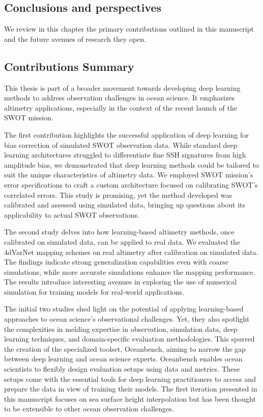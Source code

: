 \begin{bibunit}

\chapter*{Conclusions and perspectives}
\label{chap:conclusions}
We review in this chapter the primary contributions outlined in this manuscript and the future avenues of research they open.

\section*{Contributions Summary}
This thesis is part of a broader movement towards developing deep learning methods to address observation challenges in ocean science. It emphasizes altimetry applications, especially in the context of the recent launch of the SWOT mission.

The first contribution highlights the successful application of deep learning for bias correction of simulated SWOT observation data. While standard deep learning architectures struggled to differentiate fine SSH signatures from high amplitude bias, we demonstrated that deep learning methods could be tailored to suit the unique characteristics of altimetry data. We employed SWOT mission's error specifications to craft a custom architecture focused on calibrating SWOT's correlated errors. This study is promising, yet the method developed was calibrated and assessed using simulated data, bringing up questions about its applicability to actual SWOT observations.

The second study delves into how learning-based altimetry methods, once calibrated on simulated data, can be applied to real data. We evaluated the 4dVarNet mapping schemes on real altimetry after calibration on simulated data. The findings indicate strong generalization capabilities even with coarse simulations, while more accurate simulations enhance the mapping performance. The results introduce interesting avenues in exploring the use of numerical simulation for training models for real-world applications.

The initial two studies shed light on the potential of applying learning-based approaches to ocean science's observational challenges. Yet, they also spotlight the complexities in melding expertise in observation, simulation data, deep learning techniques, and domain-specific evaluation methodologies. This spurred the creation of the specialized toolset, Oceanbench, aiming to narrow the gap between deep learning and ocean science experts. Oceanbench enables ocean scientists to flexibly design evaluation setups using data and metrics. These setups come with the essential tools for deep learning practitioners to access and prepare the data in view of training their models. The first iteration presented in this manuscript focuses on sea surface height interpolation but has been thought to be extensible to other ocean observation challenges.


\end{bibunit}
